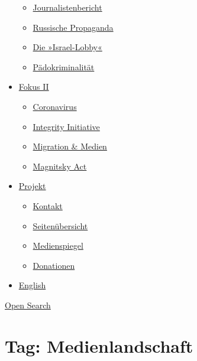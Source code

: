 \begin{itemize}
  \begin{itemize}
  \tightlist
  \item
    \href{https://swprs.org/bericht-eines-journalisten/}{Journalistenbericht}
  \item
    \href{https://swprs.org/russische-propaganda/}{Russische Propaganda}
  \item
    \href{https://swprs.org/die-israel-lobby-fakten-und-mythen/}{Die
    »Israel-Lobby«}
  \item
    \href{https://swprs.org/geopolitik-und-paedokriminalitaet/}{Pädokriminalität}
  \end{itemize}
\item
  \href{https://swprs.org/migration-und-medien/}{Fokus II}

  \begin{itemize}
  \tightlist
  \item
    \href{https://swprs.org/covid-19-hinweis-ii/}{Coronavirus}
  \item
    \href{https://swprs.org/die-integrity-initiative/}{Integrity
    Initiative}
  \item
    \href{https://swprs.org/migration-und-medien/}{Migration \& Medien}
  \item
    \href{https://swprs.org/der-fall-magnitsky/}{Magnitsky Act}
  \end{itemize}
\item
  \href{https://swprs.org/kontakt/}{Projekt}

  \begin{itemize}
  \tightlist
  \item
    \href{https://swprs.org/kontakt/}{Kontakt}
  \item
    \href{https://swprs.org/uebersicht/}{Seitenübersicht}
  \item
    \href{https://swprs.org/medienspiegel/}{Medienspiegel}
  \item
    \href{https://swprs.org/donationen/}{Donationen}
  \end{itemize}
\item
  \href{https://swprs.org/contact/}{English}
\end{itemize}

\protect\hyperlink{}{Open Search}

\hypertarget{tag-medienlandschaft}{%
\section{Tag: Medienlandschaft}\label{tag-medienlandschaft}}

